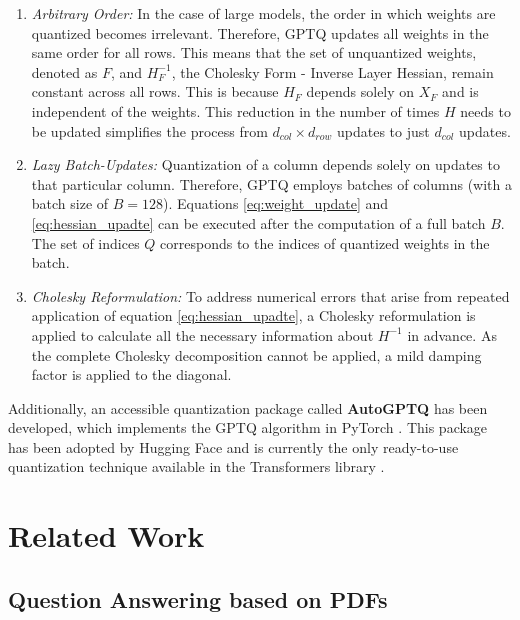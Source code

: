 \begin{enumerate}
    \item \textit{Arbitrary Order:} In the case of large models, the order in which weights are quantized becomes irrelevant. Therefore, GPTQ updates all weights in the same order for all rows. This means that the set of unquantized weights, denoted as $F$, and $H_F^{-1}$, the Cholesky Form - Inverse Layer Hessian, remain constant across all rows. This is because $H_F$ depends solely on $X_F$ and is independent of the weights. This reduction in the number of times $H$ needs to be updated simplifies the process from $d_{col} \times d_{row}$ updates to just $d_{col}$ updates.
    \item \textit{Lazy Batch-Updates:} Quantization of a column depends solely on updates to that particular column. Therefore, GPTQ employs batches of columns (with a batch size of $B = 128$). Equations \ref{eq:weight_update} and \ref{eq:hessian_upadte} can be executed after the computation of a full batch $B$. The set of indices $Q$ corresponds to the indices of quantized weights in the batch.
    \item \textit{Cholesky Reformulation:} To address numerical errors that arise from repeated application of equation \ref{eq:hessian_upadte}, a Cholesky reformulation is applied to calculate all the necessary information about $H^{-1}$ in advance. As the complete Cholesky decomposition cannot be applied, a mild damping factor is applied to the diagonal.
\end{enumerate}

Additionally, an accessible quantization package called \textbf{AutoGPTQ} has been developed, which implements the GPTQ algorithm in PyTorch \cite{william_autogptq_2023}. This package has been adopted by Hugging Face and is currently the only ready-to-use quantization technique available in the Transformers library \cite{noauthor_quantize_nodate}.

\section{Related Work}
\label{sec:related_work}

\subsection{Question Answering based on PDFs}
\label{subsec:related_work_dbqa}

